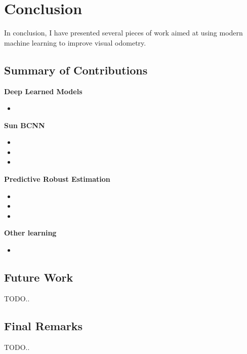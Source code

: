 \chapter{Conclusion}
In conclusion, I have presented several pieces of work aimed at using modern machine learning to improve visual odometry.

\section{Summary of Contributions}
\textbf{Deep Learned Models}
\begin{itemize}
	\item {}
\end{itemize}

\noindent\textbf{Sun BCNN}

\begin{itemize}
	\item {}
	\item {}
	\item {}
\end{itemize}

\noindent\textbf{Predictive Robust Estimation}

\begin{itemize}
	\item {}
	\item {}
	\item {}
\end{itemize}

\noindent\textbf{Other learning}

\begin{itemize}
	\item {}
\end{itemize}

\section{Future Work}
TODO..
\section{Final Remarks}
TODO..
